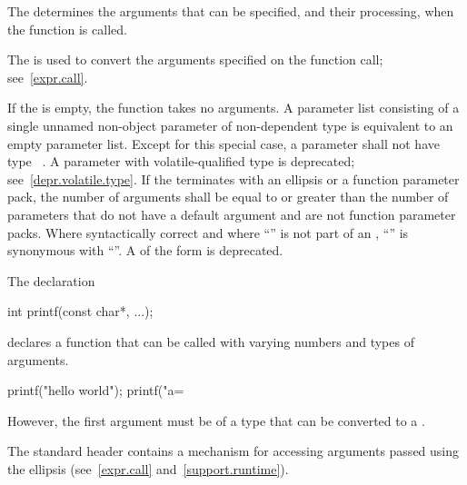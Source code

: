 \pnum
{}%
The
determines the arguments that can be specified, and their processing, when the function is called.
\begin{note}
%
The
is used to convert the arguments specified on the function call;
see~\ref{expr.call}.
\end{note}
%
If the
is empty, the function takes no arguments.
A parameter list consisting of a single unnamed non-object parameter of
non-dependent type  is equivalent to an empty parameter
list.
%
Except for this special case, a parameter shall not have type \cv{}~.
A parameter with volatile-qualified type is deprecated;
see~\ref{depr.volatile.type}.
If the
%
%
%
%
%
terminates with an ellipsis or a function parameter
pack, the number of arguments shall be equal
to or greater than the number of parameters that do not have a default
argument and are not function parameter packs.
Where syntactically correct and where ``'' is not
part of an ,
``''
is synonymous with
``''.
A 
of the form
 
is deprecated.
\begin{example}
The declaration
\begin{codeblock}
int printf(const char*, ...);
\end{codeblock}
declares a function that can be called with varying numbers and types of arguments.

\begin{codeblock}
printf("hello world");
printf("a=%
\end{codeblock}

However, the first argument must be of a type
that can be converted to a
.
\end{example}
\begin{note}
The standard header 
contains a mechanism for accessing arguments passed using the ellipsis
(see~\ref{expr.call} and~\ref{support.runtime}).
\end{note}

